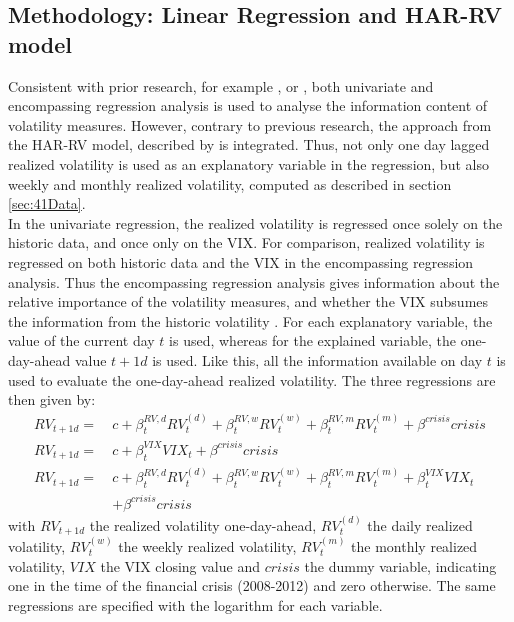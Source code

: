 \subsection{Methodology: Linear Regression and HAR-RV model}\label{sec:42Method}
Consistent with prior research, for example \textcite{jiang2003}, \textcite{canina1993} or \textcite{christensen1998}, both univariate and encompassing regression analysis is used to analyse the information content of volatility measures. However, contrary to previous research, the approach from the HAR-RV model, described by \textcite{corsi2009} is integrated. Thus, not only one day lagged realized volatility is used as an explanatory variable in the regression, but also weekly and monthly realized volatility, computed as described in section \ref{sec:41Data}.\\
In the univariate regression, the realized volatility is regressed once solely on the historic data, and once only on the \ac{VIX}. For comparison, realized volatility is regressed on both historic data and the \ac{VIX} in the encompassing regression analysis. Thus the encompassing regression analysis gives information about the relative importance of the volatility measures, and whether the \ac{VIX} subsumes the information from the historic volatility \parencite{jiang2003}. For each explanatory variable, the value of the current day $t$ is used, whereas for the explained variable, the one-day-ahead value $t+1d$ is used. Like this, all the information available on day $t$ is used to evaluate the one-day-ahead realized volatility. The three regressions are then given by:
\begin{align}
RV_{t+1d} = \ &c + \beta^{RV,d}_{t} RV^{(d)}_{t} + \beta^{RV,w}_{t} RV^{(w)}_{t} + \beta^{RV,m}_{t} RV^{(m)}_{t} + \beta^{crisis} crisis \tag{Reg1a}  \label{eq:Reg1a}\\
RV_{t+1d} = \ &c + \beta^{VIX}_{t} VIX_{t} + \beta^{crisis} crisis  \tag{Reg2a}  \label{eq:Reg2a}\\
RV_{t+1d} = \ &c + \beta^{RV,d}_{t} RV^{(d)}_{t} + \beta^{RV,w}_{t} RV^{(w)}_{t} + \beta^{RV,m}_{t} RV^{(m)}_{t} + \beta^{VIX}_{t} VIX_{t}  \nonumber \\
& + \beta^{crisis} crisis  \tag{Reg3a}  \label{eq:Reg3a}
\end{align}
with $RV_{t+1d}$ the realized volatility one-day-ahead, $RV^{(d)}_{t}$ the daily realized volatility, $RV^{(w)}_{t}$ the weekly realized volatility, $RV^{(m)}_{t}$ the monthly realized volatility, $VIX$ the \ac{VIX} closing value and $crisis$ the dummy variable, indicating one in the time of the financial crisis (2008-2012) and zero otherwise. The same regressions are specified with the logarithm for each variable.
